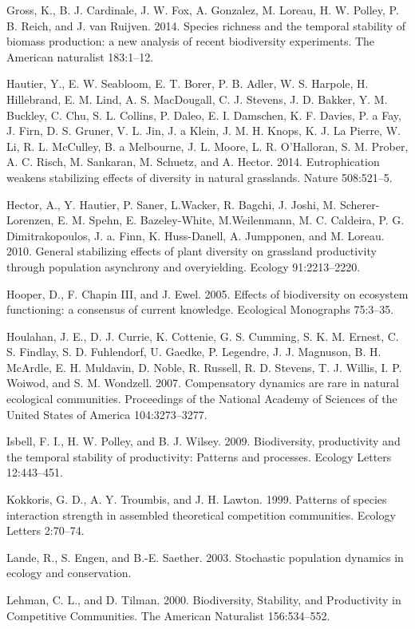 \documentclass[12pt,]{article}
\begin{document}
Gross, K., B. J. Cardinale, J. W. Fox, A. Gonzalez, M. Loreau, H. W.
Polley, P. B. Reich, and J. van Ruijven. 2014. Species richness and the
temporal stability of biomass production: a new analysis of recent
biodiversity experiments. The American naturalist 183:1--12.

Hautier, Y., E. W. Seabloom, E. T. Borer, P. B. Adler, W. S. Harpole, H.
Hillebrand, E. M. Lind, A. S. MacDougall, C. J. Stevens, J. D. Bakker,
Y. M. Buckley, C. Chu, S. L. Collins, P. Daleo, E. I. Damschen, K. F.
Davies, P. a Fay, J. Firn, D. S. Gruner, V. L. Jin, J. a Klein, J. M. H.
Knops, K. J. {La Pierre}, W. Li, R. L. McCulley, B. a Melbourne, J. L.
Moore, L. R. O'Halloran, S. M. Prober, A. C. Risch, M. Sankaran, M.
Schuetz, and A. Hector. 2014. Eutrophication weakens stabilizing effects
of diversity in natural grasslands. Nature 508:521--5.

Hector, A., Y. Hautier, P. Saner, L.Wacker, R. Bagchi, J. Joshi, M.
Scherer-Lorenzen, E. M. Spehn, E. Bazeley-White, M.Weilenmann, M. C.
Caldeira, P. G. Dimitrakopoulos, J. a. Finn, K. Huss-Danell, A.
Jumpponen, and M. Loreau. 2010. General stabilizing effects of plant
diversity on grassland productivity through population asynchrony and
overyielding. Ecology 91:2213--2220.

Hooper, D., F. {Chapin III}, and J. Ewel. 2005. Effects of biodiversity
on ecosystem functioning: a consensus of current knowledge. Ecological
Monographs 75:3--35.

Houlahan, J. E., D. J. Currie, K. Cottenie, G. S. Cumming, S. K. M.
Ernest, C. S. Findlay, S. D. Fuhlendorf, U. Gaedke, P. Legendre, J. J.
Magnuson, B. H. McArdle, E. H. Muldavin, D. Noble, R. Russell, R. D.
Stevens, T. J. Willis, I. P. Woiwod, and S. M. Wondzell. 2007.
Compensatory dynamics are rare in natural ecological communities.
Proceedings of the National Academy of Sciences of the United States of
America 104:3273--3277.

Isbell, F. I., H. W. Polley, and B. J. Wilsey. 2009. Biodiversity,
productivity and the temporal stability of productivity: Patterns and
processes. Ecology Letters 12:443--451.

Kokkoris, G. D., A. Y. Troumbis, and J. H. Lawton. 1999. Patterns of
species interaction strength in assembled theoretical competition
communities. Ecology Letters 2:70--74.

Lande, R., S. Engen, and B.-E. Saether. 2003. Stochastic population
dynamics in ecology and conservation.

Lehman, C. L., and D. Tilman. 2000. Biodiversity, Stability, and
Productivity in Competitive Communities. The American Naturalist
156:534--552.
\end{document}
